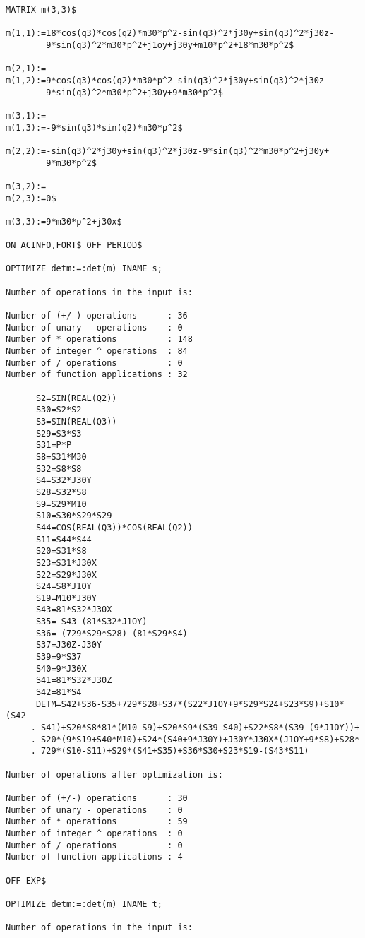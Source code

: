 {\small
\begin{verbatim}
MATRIX m(3,3)$

m(1,1):=18*cos(q3)*cos(q2)*m30*p^2-sin(q3)^2*j30y+sin(q3)^2*j30z-
        9*sin(q3)^2*m30*p^2+j1oy+j30y+m10*p^2+18*m30*p^2$

m(2,1):=
m(1,2):=9*cos(q3)*cos(q2)*m30*p^2-sin(q3)^2*j30y+sin(q3)^2*j30z-
        9*sin(q3)^2*m30*p^2+j30y+9*m30*p^2$

m(3,1):=
m(1,3):=-9*sin(q3)*sin(q2)*m30*p^2$

m(2,2):=-sin(q3)^2*j30y+sin(q3)^2*j30z-9*sin(q3)^2*m30*p^2+j30y+
        9*m30*p^2$

m(3,2):=
m(2,3):=0$

m(3,3):=9*m30*p^2+j30x$

ON ACINFO,FORT$ OFF PERIOD$

OPTIMIZE detm:=:det(m) INAME s;

Number of operations in the input is:

Number of (+/-) operations      : 36
Number of unary - operations    : 0
Number of * operations          : 148
Number of integer ^ operations  : 84
Number of / operations          : 0
Number of function applications : 32

      S2=SIN(REAL(Q2))
      S30=S2*S2
      S3=SIN(REAL(Q3))
      S29=S3*S3
      S31=P*P
      S8=S31*M30
      S32=S8*S8
      S4=S32*J30Y
      S28=S32*S8
      S9=S29*M10
      S10=S30*S29*S29
      S44=COS(REAL(Q3))*COS(REAL(Q2))
      S11=S44*S44
      S20=S31*S8
      S23=S31*J30X
      S22=S29*J30X
      S24=S8*J1OY
      S19=M10*J30Y
      S43=81*S32*J30X
      S35=-S43-(81*S32*J1OY)
      S36=-(729*S29*S28)-(81*S29*S4)
      S37=J30Z-J30Y
      S39=9*S37
      S40=9*J30X
      S41=81*S32*J30Z
      S42=81*S4
      DETM=S42+S36-S35+729*S28+S37*(S22*J1OY+9*S29*S24+S23*S9)+S10*(S42-
     . S41)+S20*S8*81*(M10-S9)+S20*S9*(S39-S40)+S22*S8*(S39-(9*J1OY))+
     . S20*(9*S19+S40*M10)+S24*(S40+9*J30Y)+J30Y*J30X*(J1OY+9*S8)+S28*
     . 729*(S10-S11)+S29*(S41+S35)+S36*S30+S23*S19-(S43*S11)

Number of operations after optimization is:

Number of (+/-) operations      : 30
Number of unary - operations    : 0
Number of * operations          : 59
Number of integer ^ operations  : 0
Number of / operations          : 0
Number of function applications : 4

OFF EXP$

OPTIMIZE detm:=:det(m) INAME t;

Number of operations in the input is:


\end{verbatim}}
